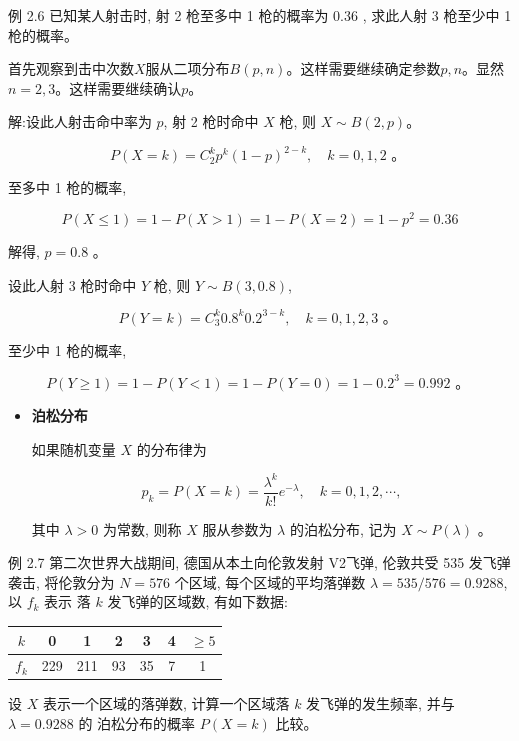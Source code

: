 \documentclass{beamer}
\begin{document}
	\begin{frame}
		例 2.6 已知某人射击时, 射 2 枪至多中 1 枪的概率为 0.36 , 求此人射 3 枪至少中 1 枪的概率。
	\end{frame}
	
	\begin{frame}
		首先观察到击中次数$X$服从二项分布$B(p, n)$。这样需要继续确定参数$p, n$。显然$n = 2,3$。这样需要继续确认$p$。
		
		\vspace*{1cm}
		解:设此人射击命中率为 $p$, 射 2 枪时命中 $X$ 枪, 则 $X \sim B(2, p)$。
		
		$$
		P(X=k)=C_{2}^{k} p^{k}(1-p)^{2-k}, \quad k=0,1,2 \text { 。 }
		$$
		
		至多中 1 枪的概率,
		
		$$
		P(X \leqslant 1)=1 - P(X > 1) =1 - P(X = 2)=1 - p ^ 2=0.36
		$$
		
		解得, $p=0.8$ 。
		
		设此人射 3 枪时命中 $Y$ 枪, 则 $Y \sim B(3,0.8)$,
		
		$$
		P(Y=k)=C_{3}^{k} 0.8^{k} 0.2^{3-k}, \quad k=0,1,2,3 \text { 。 }
		$$
		
		至少中 1 枪的概率,
		
		$$
		P(Y \geqslant 1)=1 - P(Y < 1) = 1-P(Y=0)=1-0.2^{3}=0.992 \text { 。 }
		$$
	\end{frame}
	
	\begin{frame}
		\begin{itemize}
			\item \textbf{泊松分布}
			 
			如果随机变量 $X$ 的分布律为
			
			$$
			p_{k}=P(X=k)=\frac{\lambda^{k}}{k !} e^{-\lambda}, \quad k=0,1,2, \cdots,
			$$
			
			其中 $\lambda>0$ 为常数, 则称 $X$ 服从参数为 $\lambda$ 的泊松分布, 记为 $X \sim P(\lambda)$ 。
		\end{itemize}
	\end{frame}
	
	\begin{frame}
		 例 2.7 第二次世界大战期间, 德国从本土向伦敦发射 V2飞弹, 伦敦共受 535 发飞弹袭击, 将伦敦分为 $N=576$ 个区域, 每个区域的平均落弹数 $\lambda=535 / 576=0.9288$, 以 $f_{k}$ 表示 落 $k$ 发飞弹的区域数, 有如下数据:
		 
		 \begin{tabular}{c | c c c c c c}
		 	$k$ & 0 & 1 & 2 & 3 & 4 & $\geq 5$ \\
		 	\hline 
		 	$f_k$ & 229 & 211 & 93 & 35 & 7 & 1
		 \end{tabular}
		 
		 设 $X$ 表示一个区域的落弹数, 计算一个区域落 $k$ 发飞弹的发生频率, 并与 $\lambda=0.9288$ 的 泊松分布的概率 $P(X=k)$ 比较。
	\end{frame}
	
\end{document}
